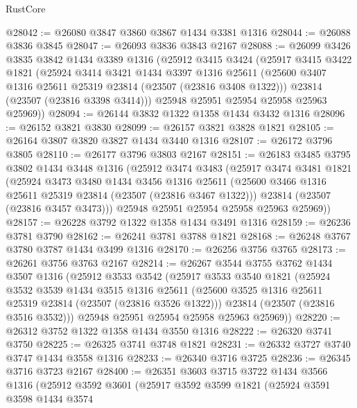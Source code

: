 \begin{lexlean}{RustCore}
\begin{coremodule}
@28042 := @26080 @3847 @3860 @3867 @1434 @3381 @1316
@28044 := @26088 @3836 @3845
@28047 := @26093 @3836 @3843 @2167
@28088 := @26099
    @3426
    @3835
    @3842
    @1434
    @3389
    @1316
    (@25912
      @3415
      @3424
      (@25917
        @3415
        @3422
        @1821
        (@25924
          @3414
          @3421
          @1434
          @3397
          @1316
          @25611
          (@25600 @3407 @1316 @25611 @25319 @23814 (@23507 (@23816 @3408 @1322)))
          @23814
          (@23507 (@23816 @3398 @3414)))
        @25948
        @25951
        @25954
        @25958
        @25963
        @25969))
@28094 := @26144 @3832 @1322 @1358 @1434 @3432 @1316
@28096 := @26152 @3821 @3830
@28099 := @26157 @3821 @3828 @1821
@28105 := @26164 @3807 @3820 @3827 @1434 @3440 @1316
@28107 := @26172 @3796 @3805
@28110 := @26177 @3796 @3803 @2167
@28151 := @26183
    @3485
    @3795
    @3802
    @1434
    @3448
    @1316
    (@25912
      @3474
      @3483
      (@25917
        @3474
        @3481
        @1821
        (@25924
          @3473
          @3480
          @1434
          @3456
          @1316
          @25611
          (@25600 @3466 @1316 @25611 @25319 @23814 (@23507 (@23816 @3467 @1322)))
          @23814
          (@23507 (@23816 @3457 @3473)))
        @25948
        @25951
        @25954
        @25958
        @25963
        @25969))
@28157 := @26228 @3792 @1322 @1358 @1434 @3491 @1316
@28159 := @26236 @3781 @3790
@28162 := @26241 @3781 @3788 @1821
@28168 := @26248 @3767 @3780 @3787 @1434 @3499 @1316
@28170 := @26256 @3756 @3765
@28173 := @26261 @3756 @3763 @2167
@28214 := @26267
    @3544
    @3755
    @3762
    @1434
    @3507
    @1316
    (@25912
      @3533
      @3542
      (@25917
        @3533
        @3540
        @1821
        (@25924
          @3532
          @3539
          @1434
          @3515
          @1316
          @25611
          (@25600 @3525 @1316 @25611 @25319 @23814 (@23507 (@23816 @3526 @1322)))
          @23814
          (@23507 (@23816 @3516 @3532)))
        @25948
        @25951
        @25954
        @25958
        @25963
        @25969))
@28220 := @26312 @3752 @1322 @1358 @1434 @3550 @1316
@28222 := @26320 @3741 @3750
@28225 := @26325 @3741 @3748 @1821
@28231 := @26332 @3727 @3740 @3747 @1434 @3558 @1316
@28233 := @26340 @3716 @3725
@28236 := @26345 @3716 @3723 @2167
@28400 := @26351
    @3603
    @3715
    @3722
    @1434
    @3566
    @1316
    (@25912
      @3592
      @3601
      (@25917
        @3592
        @3599
        @1821
        (@25924
          @3591
          @3598
          @1434
          @3574

\end{coremodule}
\end{lexlean}
